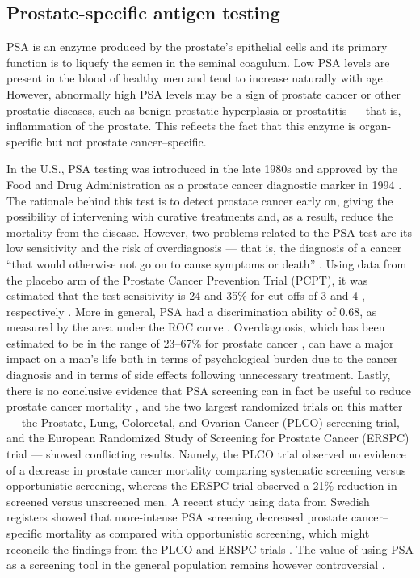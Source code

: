 \subsection{Prostate-specific antigen testing}
PSA is an enzyme produced by the prostate's epithelial cells and its primary function is to liquefy the semen in the seminal coagulum. Low PSA levels are present in the blood of healthy men and tend to increase naturally with age \citep{lilja_prostatespecific_2008}. However, abnormally high PSA levels may be a sign of prostate cancer or other prostatic diseases, such as benign prostatic hyperplasia or prostatitis --- that is, inflammation of the prostate. This reflects the fact that this enzyme is organ-specific but not prostate cancer--specific.

In the U.S., PSA testing was introduced in the late 1980s and approved by the Food and Drug Administration as a prostate cancer diagnostic marker in 1994 \citep{lilja_prostatespecific_2008}. The rationale behind this test is to detect prostate cancer early on, giving the possibility of intervening with curative treatments and, as a result, reduce the mortality from the disease. However, two problems related to the PSA test are its low sensitivity and the risk of overdiagnosis --- that is, the diagnosis of a cancer ``that would otherwise not go on to cause symptoms or death'' \citep{welch_overdiagnosis_2010}. Using data from the placebo arm of the Prostate Cancer Prevention Trial (PCPT), it was estimated that the test sensitivity is 24 and 35\% for cut-offs of 3 and 4 \ngml{}, respectively \citep{thompson_effect_2006}. More in general, PSA had a discrimination ability of 0.68, as measured by the area under the ROC curve \citep{thompson_effect_2006}. Overdiagnosis, which has been estimated to be in the range of 23--67\% for prostate cancer \citep{draisma_lead_2009, welch_overdiagnosis_2010}, can have a major impact on a man's life both in terms of psychological burden due to the cancer diagnosis and in terms of side effects following unnecessary treatment. Lastly, there is no conclusive evidence that PSA screening can in fact be useful to reduce prostate cancer mortality \citep{cuzick_prevention_2014}, and the two largest randomized trials on this matter --- the Prostate, Lung, Colorectal, and Ovarian Cancer (PLCO) screening trial, and the European Randomized Study of Screening for Prostate Cancer (ERSPC) trial ---  showed conflicting results. Namely, the PLCO trial observed no evidence of a decrease in prostate cancer mortality comparing systematic screening versus opportunistic screening, whereas the ERSPC trial observed a 21\% reduction in screened versus unscreened men. A recent study using data from Swedish registers showed that more-intense PSA screening decreased prostate cancer--specific mortality as compared with opportunistic screening, which might reconcile the findings from the PLCO  and ERSPC trials \citep{stattin_prostate_2014}. The value of using PSA as a screening tool in the general population remains however controversial \citep{cuzick_prevention_2014}.

